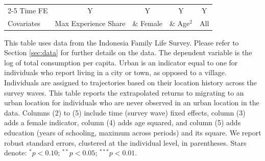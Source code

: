 \begin{table}[htbp]
\begin{threeparttable}
\begin{tabular}{l cccc}
\cmidrule{2-5} Time FE & Y & Y & Y & Y \\ Covariates & Max Experience Share & \& Female & \& Age$^2$ & All \\ \bottomrule \end{tabular} \begin{tablenotes}[flushleft] \footnotesize \item{This table uses data from the Indonesia Family Life Survey. Please refer to Section \ref{sec:data} for further details on the data. The dependent variable is the log of total consumption per capita. Urban is an indicator equal to one for individuals who report living in a city or town, as opposed to a village. Individuals are assigned to trajectories based on their location history across the survey waves. This table reports the extrapolated returns to migrating to an urban location for individuals who are never observed in an urban location in the data. Columns (2) to (5) include time (survey wave) fixed effects, column (3) adds a female indicator, column (4) adds age squared, and column (5) adds education (years of schooling, maximum across periods) and its square. We report robust standard errors, clustered at the individual level, in parentheses. Stars denote: $^{*} p<0.10$; $^{**} p<0.05$; $^{***} p<0.01$.} \end{tablenotes} \end{threeparttable} \end{table}
